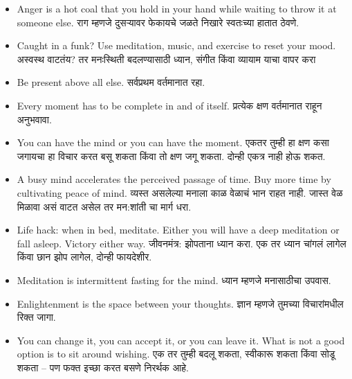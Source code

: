 \begin{itemize}
  \item Anger is a hot coal that you hold in your hand while waiting to throw it at someone else. राग म्हणजे दुसऱ्यावर फेकायचे जळते निखारे स्वतःच्या हातात ठेवणे.

  \item Caught in a funk? Use meditation, music, and exercise to reset your mood. अस्वस्थ वाटतंय? तर मनःस्थिती बदलण्यासाठी ध्यान, संगीत किंवा व्यायाम याचा वापर करा

  \item Be present above all else. सर्वप्रथम वर्तमानात रहा. 

  \item Every moment has to be complete in and of itself. प्रत्येक क्षण वर्तमानात राहून अनुभवावा. 

  \item You can have the mind or you can have the moment. एकतर तुम्ही हा क्षण कसा जगायचा हा विचार करत बसू शकता किंवा तो क्षण जगू शकता. दोन्ही एकत्र नाही होऊ शकत. 

  \item A busy mind accelerates the perceived passage of time. Buy more time by cultivating peace of mind. व्यस्त असलेल्या मनाला काळ वेळाचं भान राहत नाही. जास्त वेळ मिळावा असं वाटत असेल तर मन:शांती चा मार्ग धरा.  

  \item Life hack: when in bed, meditate. Either you will have a deep meditation or fall asleep. Victory either way. जीवनमंत्र: झोपताना ध्यान करा. एक तर ध्यान चांगलं लागेल किंवा छान झोप लागेल, दोन्ही फायदेशीर. 

  \item Meditation is intermittent fasting for the mind. ध्यान म्हणजे मनासाठीचा उपवास. 

  \item Enlightenment is the space between your thoughts. ज्ञान म्हणजे तुमच्या विचारांमधील रिक्त जागा.

  \item You can change it, you can accept it, or you can leave it. What is not a good option is to sit around wishing. एक तर तुम्ही बदलू शकता, स्वीकारू शकता किंवा सोडू शकता – पण फक्त इच्छा करत बसणे निरर्थक आहे. 
\end{itemize}

